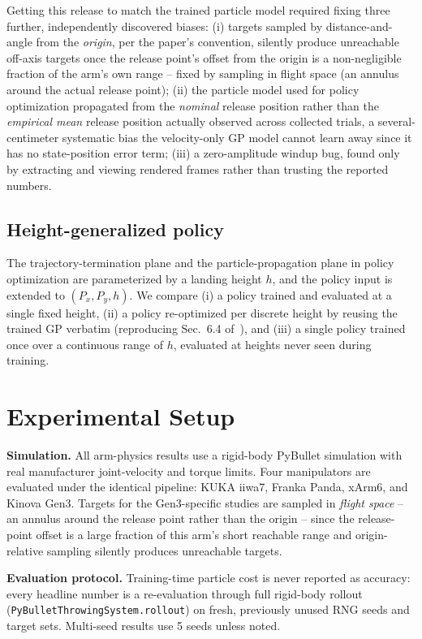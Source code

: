 \documentclass[conference]{IEEEtran}
\begin{document}
Getting this release to match the trained particle model required fixing
three further, independently discovered biases: (i) targets sampled by
distance-and-angle from the \emph{origin}, per the paper's convention,
silently produce unreachable off-axis targets once the release point's
offset from the origin is a non-negligible fraction of the arm's own
range -- fixed by sampling in flight space (an annulus around the actual
release point); (ii) the particle model used for policy optimization
propagated from the \emph{nominal} release position rather than the
\emph{empirical mean} release position actually observed across collected
trials, a several-centimeter systematic bias the velocity-only GP model
cannot learn away since it has no state-position error term; (iii) a
zero-amplitude windup bug, found only by extracting and viewing rendered
frames rather than trusting the reported numbers.

\subsection{Height-generalized policy}
The trajectory-termination plane and the particle-propagation plane in
policy optimization are parameterized by a landing height $h$, and the
policy input is extended to $(P_x, P_y, h)$. We compare (i) a policy
trained and evaluated at a single fixed height, (ii) a policy re-optimized
per discrete height by reusing the trained GP verbatim (reproducing
Sec.~6.4 of~\cite{turcato2025mcpilot}), and (iii) a single policy trained
once over a continuous range of $h$, evaluated at heights never seen during
training.

\section{Experimental Setup}
\label{sec:setup}

\textbf{Simulation.} All arm-physics results use a rigid-body PyBullet
simulation with real manufacturer joint-velocity and torque limits.
Four manipulators are evaluated under the identical pipeline: KUKA iiwa7,
Franka Panda, xArm6, and Kinova Gen3. Targets for the Gen3-specific studies
are sampled in \emph{flight space} -- an annulus around the release point
rather than the origin -- since the release-point offset is a large
fraction of this arm's short reachable range and origin-relative sampling
silently produces unreachable targets.

\textbf{Evaluation protocol.} Training-time particle cost is never reported
as accuracy: every headline number is a re-evaluation through full
rigid-body rollout (\texttt{PyBulletThrowingSystem.rollout}) on fresh,
previously unused RNG seeds and target sets. Multi-seed results use 5
seeds unless noted.
\end{document}
